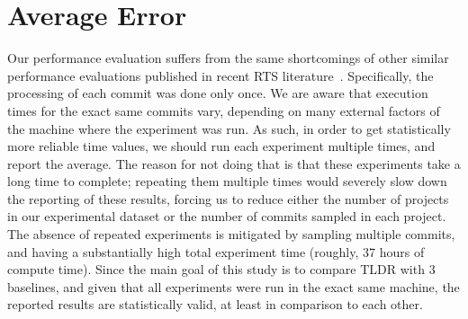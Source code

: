 \section{Average Error}

Our performance evaluation suffers from the same shortcomings of other similar performance evaluations published in recent RTS literature~\cite{rtsplusplus, starts,ekstazi,faulttracer}. Specifically, the processing of each commit was done only once. We are aware that execution times for the exact same commits vary, depending on many external factors of the machine where the experiment was run. As such, in order to get statistically more reliable time values, we should run each experiment multiple times, and report the average. The reason for not doing that is that these experiments take a long time to complete; repeating them multiple times would severely slow down the reporting of these results, forcing us to reduce either the number of projects in our experimental dataset or the number of commits sampled in each project. The absence of repeated experiments is mitigated by sampling multiple commits, and having a substantially high total experiment time (roughly, 37 hours of compute time). Since the main goal of this study is to compare TLDR with 3 baselines, and given that all experiments were run in the exact same machine, the reported results are statistically valid, at least in comparison to each other.


